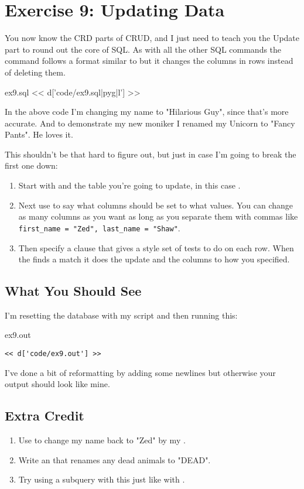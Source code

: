 \chapter{Exercise 9: Updating Data}

You now know the CRD parts of CRUD, and I just need to teach you the Update
part to round out the core of SQL.  As with all the other SQL commands
the  command follows a format similar to  but
it changes the columns in rows instead of deleting them.

\begin{code}{ex9.sql}
<< d['code/ex9.sql|pyg|l'] >>
\end{code}

In the above code I'm changing my name to "Hilarious Guy", since that's
more accurate.  And to demonstrate my new moniker I renamed my Unicorn
to "Fancy Pants".  He loves it.

This shouldn't be that hard to figure out, but just in case I'm going to
break the first one down:

\begin{enumerate}
\item Start with  and the table you're going to update, in this
    case .
\item Next use  to say what columns should be set to what values.
    You can change as many columns as you want as long as you separate them
    with commas like \verb|first_name = "Zed", last_name = "Shaw"|.
\item Then specify a  clause that gives a  style
    set of tests to do on each row.  When the  finds a match it
    does the update and  the columns to how you specified.
\end{enumerate}

\section{What You Should See}

I'm resetting the database with my  script and then running
this:

\begin{code}{ex9.out}
\begin{Verbatim}
<< d['code/ex9.out'] >>
\end{Verbatim}
\end{code}

I've done a bit of reformatting by adding some newlines but otherwise
your output should look like mine.

\section{Extra Credit}

\begin{enumerate}
\item Use  to change my name back to "Zed" by my .
\item Write an  that renames any dead animals to "DEAD".
\item Try using a subquery with this just like with .
\end{enumerate}


